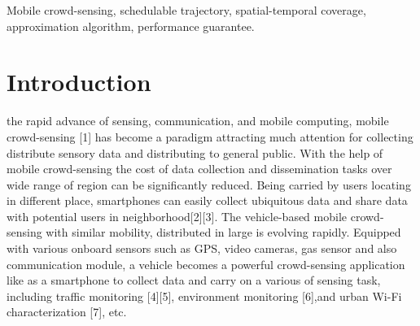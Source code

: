\documentclass[journal]{IEEEtran}
\begin{document}
\begin{IEEEkeywords}
Mobile crowd-sensing, schedulable trajectory, spatial-temporal coverage, approximation algorithm, performance guarantee.
\end{IEEEkeywords}






%
\IEEEpeerreviewmaketitle



\section{Introduction}

% 
% 
% 
% 
 the rapid advance of sensing, communication, and mobile computing, mobile crowd-sensing [1] has become a paradigm attracting much attention for collecting distribute sensory data and distributing to general public. With the help of mobile crowd-sensing the cost of data collection and dissemination tasks over wide range of region can be significantly reduced. Being carried by users locating in different place, smartphones can easily collect ubiquitous data and share data with potential users in neighborhood[2][3]. The vehicle-based mobile crowd-sensing with similar mobility, distributed in large is evolving rapidly. Equipped with various onboard sensors such as GPS, video cameras, gas sensor and also communication module, a vehicle becomes a powerful crowd-sensing application like as a smartphone to collect data and carry on a various of sensing task, including traffic monitoring [4][5], environment monitoring [6],and urban Wi-Fi characterization [7], etc. 
\end{document}

